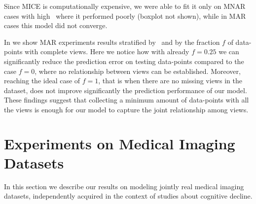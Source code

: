 Since MICE is computationally expensive, we were able to fit it only on MNAR cases with high \snr\, where it performed poorly (boxplot not shown), while in MAR cases this model did not converge.

In  we show MAR experiments results stratified by \snr\ and by the fraction $f$ of data-points with complete views.
Here we notice how with already $f = 0.25$ we can significantly reduce the prediction error on testing data-points compared to the case $f=0$, where no relationship between views can be established.
Moreover, reaching the ideal case of $f=1$, that is when there are no missing views in the dataset, does not improve significantly the prediction performance of our model.
These findings suggest that collecting a minimum amount of data-points with all the views is enough for our model to capture the joint relationship among views.

\section{Experiments on Medical Imaging Datasets}
\label{ssec:real}


% 
% 



% 

In this section we describe our results on modeling jointly real medical imaging datasets, independently acquired in the context of studies about cognitive decline.



